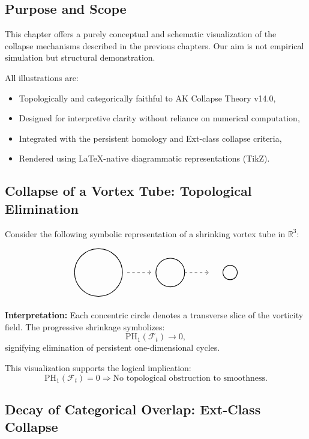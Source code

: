 \documentclass[11pt]{article}
\begin{document}
\subsection{Purpose and Scope}

This chapter offers a purely conceptual and schematic visualization of the collapse mechanisms described in the previous chapters. Our aim is not empirical simulation but structural demonstration.

All illustrations are:
\begin{itemize}
  \item Topologically and categorically faithful to AK Collapse Theory v14.0,
  \item Designed for interpretive clarity without reliance on numerical computation,
  \item Integrated with the persistent homology and Ext-class collapse criteria,
  \item Rendered using LaTeX-native diagrammatic representations (TikZ).
\end{itemize}

\subsection{Collapse of a Vortex Tube: Topological Elimination}

Consider the following symbolic representation of a shrinking vortex tube in \( \mathbb{R}^3 \):

\[
\begin{tikzpicture}
\draw[thick] (0,0) circle (1);
\draw[dashed,->] (1.2,0) -- (2.2,0);
\draw[thick] (3,0) circle (0.6);
\draw[dashed,->] (3.6,0) -- (4.6,0);
\draw[thick] (5.5,0) circle (0.3);
\end{tikzpicture}
\]

\textbf{Interpretation:}
Each concentric circle denotes a transverse slice of the vorticity field. The progressive shrinkage symbolizes:
\[
\mathrm{PH}_1(\mathcal{F}_t) \longrightarrow 0,
\]
signifying elimination of persistent one-dimensional cycles.

This visualization supports the logical implication:
\[
\mathrm{PH}_1(\mathcal{F}_t) = 0 \Rightarrow \text{No topological obstruction to smoothness}.
\]

\subsection{Decay of Categorical Overlap: Ext-Class Collapse}
\end{document}
